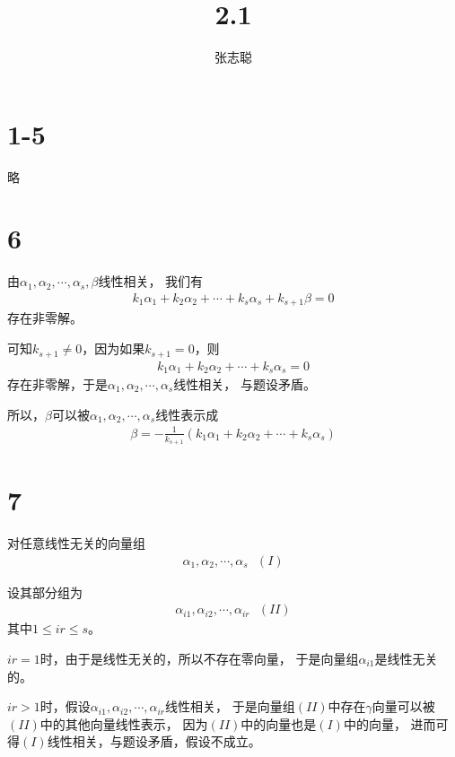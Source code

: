 \documentclass{article}
\begin{document}
\title{2.1}
\author{张志聪}
\maketitle

\section*{1-5}
略

\section*{6}

由$\alpha_1, \alpha_2, \cdots, \alpha_s, \beta$线性相关，
我们有
\begin{align*}
  k_1\alpha_1 + k_2\alpha_2 + \cdots + k_s\alpha_s + k_{s + 1} \beta = 0
\end{align*}
存在非零解。

可知$k_{s + 1} \neq 0$，因为如果$k_{s + 1} = 0$，则
\begin{align*}
  k_1\alpha_1 + k_2\alpha_2 + \cdots + k_s\alpha_s = 0
\end{align*}
存在非零解，于是$\alpha_1, \alpha_2, \cdots, \alpha_s$线性相关，
与题设矛盾。

所以，$\beta$可以被$\alpha_1, \alpha_2, \cdots, \alpha_s$线性表示成
\begin{align*}
  \beta = - \frac{1}{k_{s + 1}} (k_1\alpha_1 + k_2\alpha_2 + \cdots + k_s\alpha_s)
\end{align*}

\section*{7}

对任意线性无关的向量组
\begin{align*}
  \alpha_1, \alpha_2, \cdots, \alpha_s \ \ \ (I)
\end{align*}

设其部分组为
\begin{align*}
  \alpha_{i1}, \alpha_{i2}, \cdots, \alpha_{ir} \ \ \ (II)
\end{align*}
其中$1 \leq ir \leq s$。

$ir = 1$时，由于是线性无关的，所以不存在零向量，
于是向量组$\alpha_{i1}$是线性无关的。

$ir > 1$时，假设$\alpha_{i1}, \alpha_{i2}, \cdots, \alpha_{ir}$线性相关，
于是向量组$(II)$中存在$\gamma$向量可以被$(II)$中的其他向量线性表示，
因为$(II)$中的向量也是$(I)$中的向量，
进而可得$(I)$线性相关，与题设矛盾，假设不成立。
\end{document}
